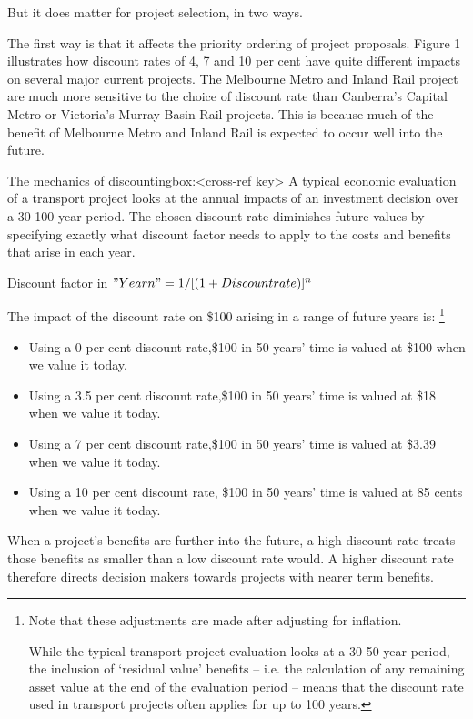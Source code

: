 But it does matter for project selection, in two ways.

The first way is that it affects the priority ordering of project proposals. Figure 1 illustrates how discount rates of 4, 7 and 10 per cent have quite different impacts on several major current projects. The Melbourne Metro and Inland Rail project are much more sensitive to the choice of discount rate than Canberra’s Capital Metro or Victoria’s Murray Basin Rail projects. This is because much of the benefit of Melbourne Metro and Inland Rail is expected to occur well into the future.

\begin{smallbox}{The mechanics of discounting}{box:<cross-ref key>}
A typical economic evaluation of a transport project looks at the annual impacts of an investment decision over a 30-100 year period. The chosen discount rate diminishes future values by specifying exactly what discount factor needs to apply to the costs and benefits that arise in each year. 

Discount factor in $"Year  n"=  1/[(1+Discount rate)]^n$ 

The impact of the discount rate on \$100 arising in a range of future years is:%
    \footnote{Note that these adjustments are made after adjusting for inflation. 

    While the typical transport project evaluation looks at a 30-50 year period, the inclusion of ‘residual value’ benefits – i.e. the calculation of any remaining asset value at the end of the evaluation period – means that the discount rate used in transport projects often applies for up to 100 years.}

\begin{itemize}
\item Using a 0 per cent discount rate,\$100 in 50 years’ time is valued at \$100 when we value it today.
\item Using a 3.5 per cent discount rate,\$100 in 50 years’ time is valued at \$18 when we value it today.
\item Using a 7 per cent discount rate,\$100 in 50 years’ time is valued at \$3.39 when we value it today.
\item Using a 10 per cent discount rate, \$100 in 50 years’ time is valued at 85 cents when we value it today.
\end{itemize}

\end{smallbox}

When a project’s benefits are further into the future, a high discount rate treats those benefits as smaller than a low discount rate would. A higher discount rate therefore directs decision makers towards projects with nearer term benefits. 

